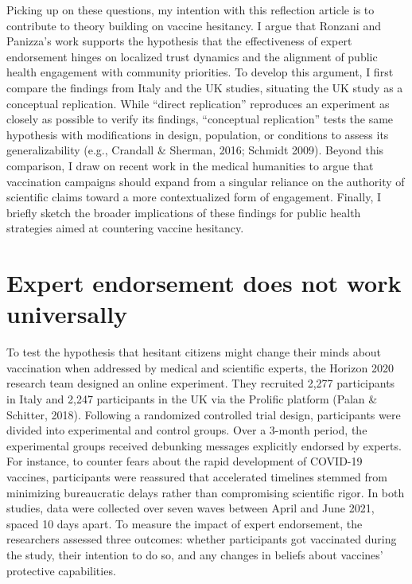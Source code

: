 \documentclass[authordate, empirical]{jote-new-article}
\begin{document}
	Picking up on these questions, my intention with this reflection article is to contribute to theory building on vaccine hesitancy. I argue that Ronzani and Panizza's work supports the hypothesis that the effectiveness of expert endorsement hinges on localized trust dynamics and the alignment of public health engagement with community priorities. To develop this argument, I first compare the findings from Italy and the UK studies, situating the UK study as a conceptual replication. While “direct replication” reproduces an experiment as closely as possible to verify its findings, “conceptual replication” tests the same hypothesis with modifications in design, population, or conditions to assess its generalizability (e.g., Crandall \& Sherman, 2016; Schmidt 2009). Beyond this comparison, I draw on recent work in the medical humanities to argue that vaccination campaigns should expand from a singular reliance on the authority of scientific claims toward a more contextualized form of engagement. Finally, I briefly sketch the broader implications of these findings for public health strategies aimed at countering vaccine hesitancy.







	\section{Expert endorsement does not work universally}



	To test the hypothesis that hesitant citizens might change their minds about vaccination when addressed by medical and scientific experts, the Horizon 2020 research team designed an online experiment. They recruited 2,277 participants in Italy and 2,247 participants in the UK via the Prolific platform (Palan \& Schitter, 2018). Following a randomized controlled trial design, participants were divided into experimental and control groups. Over a 3-month period, the experimental groups received debunking messages explicitly endorsed by experts. For instance, to counter fears about the rapid development of COVID-19 vaccines, participants were reassured that accelerated timelines stemmed from minimizing bureaucratic delays rather than compromising scientific rigor. In both studies, data were collected over seven waves between April and June 2021, spaced 10 days apart. To measure the impact of expert endorsement, the researchers assessed three outcomes: whether participants got vaccinated during the study, their intention to do so, and any changes in beliefs about vaccines' protective capabilities.
\end{document}
